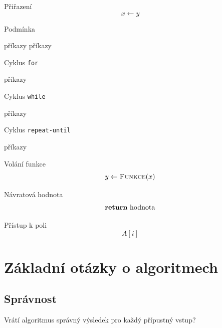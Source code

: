\documentclass[openany,12pt,a4paper]{book}
\begin{document}
\begin{pseudocodecardblue}{Přiřazení}
\[
x \gets y
\]
\end{pseudocodecardblue}

\begin{pseudocodecardorange}{Podmínka}
\begin{algorithmic}[1]
    \State příkazy
  \Else
    \State příkazy
  \EndIf
\end{algorithmic}
\end{pseudocodecardorange}

\begin{pseudocodecardblue}{Cyklus \texttt{for}}
\begin{algorithmic}[1]
    \State příkazy
  \EndFor
\end{algorithmic}
\end{pseudocodecardblue}

\begin{pseudocodecardorange}{Cyklus \texttt{while}}
\begin{algorithmic}[1]
    \State příkazy
  \EndWhile
\end{algorithmic}
\end{pseudocodecardorange}

\begin{pseudocodecardblue}{Cyklus \texttt{repeat-until}}
\begin{algorithmic}[1]
  \Repeat
    \State příkazy
\end{algorithmic}
\end{pseudocodecardblue}

\begin{pseudocodecardorange}{Volání funkce}
\[
y \gets \textsc{Funkce}(x)
\]
\end{pseudocodecardorange}

\begin{pseudocodecardblue}{Návratová hodnota}
\[
\Return \ \text{hodnota}
\]
\end{pseudocodecardblue}

\begin{pseudocodecardorange}{Přístup k poli}
\[
A[i]
\]
\end{pseudocodecardorange}
 
\section{Základní otázky o algoritmech}

\subsection{Správnost}
Vrátí algoritmus správný výsledek pro každý přípustný vstup?
\end{document}
